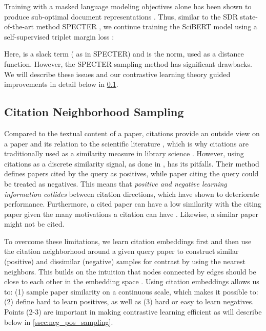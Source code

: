 \documentclass[11pt]{article}
\begin{document}
Training with a masked language modeling objectives alone has been shown to produce sub-optimal document representations \cite{Li2020,Gao2021}. Thus, similar to the SDR state-of-the-art method SPECTER \cite{Cohan2020}, we continue training the SciBERT model \cite{Beltagy2019} using a self-supervised triplet margin loss \cite{TripletLossORG}:

\noindent Here,  is a slack term ( as in SPECTER) and  is the  norm, used as a distance function. However, the SPECTER sampling method has significant drawbacks. We will describe these issues and our contrastive learning theory guided improvements in detail below in \cref{ssec:CGEmbeddings}.


\subsection{Citation Neighborhood Sampling} \label{ssec:CGEmbeddings}


Compared to the textual content of a paper, citations provide an outside view on a paper and its relation to the scientific literature  \cite{Elkiss2008}, which is why citations are traditionally used as a similarity measure in library science \cite{Kessler1963,Small1973}.
However, using citations as a discrete similarity signal, as done in \citet{Cohan2020}, has its pitfalls. Their method defines papers cited by the query as positives, while paper citing the query could be treated as negatives. This means that \emph{positive and negative learning information collides} between citation directions, which \citet{ContrastiveLearningLimitations} have shown to deteriorate performance.  
Furthermore, a cited paper can have a low similarity with the citing paper given the many motivations a citation can have \cite{Teufel2006}.
Likewise, a similar paper might not be cited. 

To overcome these limitations, we learn citation embeddings first and then use the citation neighborhood around a given query paper  to construct similar (positive) and dissimilar (negative) samples for contrast 
by using the  nearest neighbors.
This builds on the intuition that nodes connected by edges should be close to each other in the embedding space \cite{Perozzi2014}. Using citation embeddings allows us to: (1) sample paper similarity on a continuous scale, which makes it possible to: (2) define hard to learn positives, as well as (3) hard or easy to learn negatives. Points (2-3) are important in making contrastive learning efficient as will describe below in \cref{ssec:neg_pos_sampling}.
\end{document}
